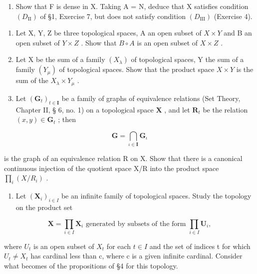 \begin{enumerate}
\def\labelenumi{\alph{enumi})}
\setcounter{enumi}{1}
\tightlist
\item
  Show that F is dense in X. Taking A = N, deduce that X satisfies condition \((D_{\mathrm{II}})\) of §1, Exercise 7, but does not satisfy condition \((D_{\mathrm{III}})\) (Exercise 4).
\end{enumerate}

\begin{enumerate}
\def\labelenumi{\arabic{enumi})}
\setcounter{enumi}{5}
\item
  Let X, Y, Z be three topological spaces, A an open subset of \(X \times Y\) and B an open subset of \(Y \times Z\) . Show that \(B \circ A\) is an open subset of \(X \times Z\) .
\item
  Let X be the sum of a family \((X_{\lambda})\) of topological spaces, Y the sum of a family \((Y_{\mu})\) of topological spaces. Show that the product space \(X \times Y\) is the sum of the \(X_{\lambda} \times Y_{\mu}\) .
\item
  Let \((\mathbf{G}_t)_{t \in \mathbf{I}}\) be a family of graphs of equivalence relations (Set Theory, Chapter II, § 6, no. 1) on a topological space \(\mathbf{X}\) , and let \(\mathbf{R}_t\) be the relation \((x, y) \in \mathbf{G}_t\) ; then
\end{enumerate}

\[
\mathbf {G} = \bigcap_ {\iota \in \mathbf {I}} \mathbf {G} _ {\iota}
\]

is the graph of an equivalence relation R on X. Show that there is a canonical continuous injection of the quotient space X/R into the product space \(\prod_{i}\left(X/R_{i}\right)\) .

\begin{enumerate}
\def\labelenumi{\arabic{enumi})}
\setcounter{enumi}{8}
\tightlist
\item
  Let \((\mathbf{X}_i)_{i\in I}\) be an infinite family of topological spaces. Study the topology on the product set
\end{enumerate}

\[
\mathbf {X} = \prod_ {i \in I} \mathbf {X} _ {i} \text {   generated   by   subsets   of   the   form   } \prod_ {i \in I} \mathbf {U} _ {i},
\]

where \(U_{t}\) is an open subset of \(X_{t}\) for each \(t \in I\) and the set of indices t for which \(U_{t} \neq X_{t}\) has cardinal less than c, where c is a given infinite cardinal. Consider what becomes of the propositions of §4 for this topology.

